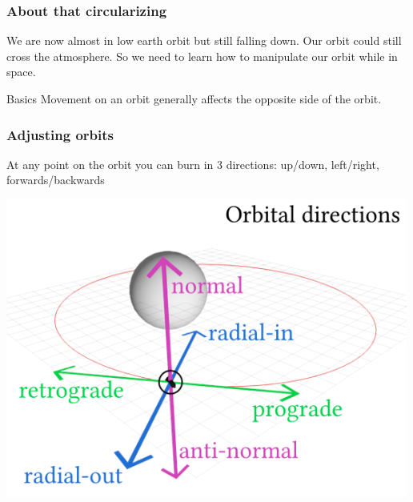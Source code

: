 {
%
\begin{frame}
\end{frame}
\begin{frame}
    \frametitle{About that circularizing}
    \begin{block}{}
        We are now almost in low earth orbit but still falling down. Our orbit could still cross the atmosphere.
        So we need to learn how to manipulate our orbit while in space.
    \end{block}
    \begin{block}{Basics}
        Movement on an orbit generally affects the opposite side of the orbit.
    \end{block}
\end{frame}
\begin{frame}
    \frametitle{Adjusting orbits}
    \begin{block}{}
        \begin{center}
            At any point on the orbit you can burn in 3 directions: up/down, left/right, forwards/backwards
        \end{center}
    \end{block}
    \begin{block}{}
        \begin{center}
            \includegraphics[scale=0.8]{images/maneuver_node}

\end{center}
\end{block}
\end{frame}}
